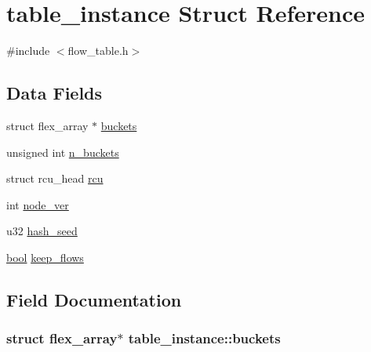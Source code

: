 \hypertarget{structtable__instance}{}\section{table\+\_\+instance Struct Reference}
\label{structtable__instance}


{\ttfamily \#include $<$flow\+\_\+table.\+h$>$}

\subsection*{Data Fields}
\begin{DoxyCompactItemize}
\item 
struct flex\+\_\+array $\ast$ \hyperlink{structtable__instance_a6522309983b8c287da819f666da07355}{buckets}
\item 
unsigned int \hyperlink{structtable__instance_ae4f915a0e1b19ca677ae00c7eb5a3cb9}{n\+\_\+buckets}
\item 
struct rcu\+\_\+head \hyperlink{structtable__instance_acf4d72ccfb947d0d0d08732a56664978}{rcu}
\item 
int \hyperlink{structtable__instance_ab992e9218f85e3b5193ae47e8fbf3f32}{node\+\_\+ver}
\item 
u32 \hyperlink{structtable__instance_ad73f318c365fd86dda23e7ffb65d59b9}{hash\+\_\+seed}
\item 
\hyperlink{types_8h_afaa87723b8417d40fcf45b7330261ef9}{bool} \hyperlink{structtable__instance_af7a3a9cce56cbf7ed225ac0ec3ce9eb2}{keep\+\_\+flows}
\end{DoxyCompactItemize}


\subsection{Field Documentation}
\hypertarget{structtable__instance_a6522309983b8c287da819f666da07355}{}
\subsubsection[{buckets}]{\setlength{\rightskip}{0pt plus 5cm}struct flex\+\_\+array$\ast$ table\+\_\+instance\+::buckets}\label{structtable__instance_a6522309983b8c287da819f666da07355}
\hypertarget{structtable__instance_ad73f318c365fd86dda23e7ffb65d59b9}{}
